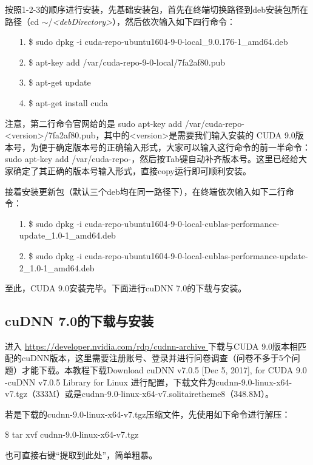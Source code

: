 \documentclass[11pt,a4paper]{ctexart}
\begin{document}
按照1-2-3的顺序进行安装，先基础安装包，首先在终端切换路径到deb安装包所在路径（cd $\sim$/\emph{<debDirectory>}），然后依次输入如下四行命令：
\begin{itemize}
\item[1.] \$ sudo dpkg -i cuda-repo-ubuntu1604-9-0-local\_9.0.176-1\_amd64.deb
\item[2.] \$ apt-key add /var/cuda-repo-{\color{red}9-0-local}/7fa2af80.pub 
\item[3.] \$ apt-get update
\item[4.] \$ apt-get install cuda
\end{itemize}
注意，第二行命令官网给的是 sudo apt-key add /var/cuda-repo-{\color{red}<version>}/7fa2af80.pub，其中的{\color{red}<version>}是需要我们输入安装的 CUDA 9.0版本号，为便于确定版本号的正确输入形式，大家可以输入这行命令的前一半命令：sudo apt-key add /var/cuda-repo-，然后按{\color{red}Tab}键自动补齐版本号。这里已经给大家确定了其正确的版本号输入形式，直接copy运行即可顺利安装。

接着安装更新包（默认三个deb均在同一路径下），在终端依次输入如下二行命令：
\vspace{-0.2cm}
\begin{itemize}
\item[1.] \$ sudo dpkg -i cuda-repo-ubuntu1604-9-0-local-cublas-performance-update\_1.0-1\_amd64.deb 
\item[2.] \$ sudo dpkg -i cuda-repo-ubuntu1604-9-0-local-cublas-performance-update-2\_1.0-1\_amd64.deb 
\end{itemize}

至此，CUDA 9.0安装完毕。下面进行cuDNN 7.0的下载与安装。



\subsection{ cuDNN 7.0的下载与安装}
进入 \url {https://developer.nvidia.com/rdp/cudnn-archive } 下载与CUDA  9.0版本相匹配的cuDNN版本，这里需要注册账号、登录并进行问卷调查（问卷不多于5个问题）才能下载。本教程下载Download cuDNN v7.0.5 [Dec 5, 2017], for CUDA 9.0 -cuDNN v7.0.5 Library for Linux 进行配置，下载文件为cudnn-9.0-linux-x64-v7.tgz（333M）或是cudnn-9.0-linux-x64-v7.solitairetheme8（348.8M）。

若是下载的cudnn-9.0-linux-x64-v7.tgz压缩文件，先使用如下命令进行解压：
\begin{center}
\$ tar xvf cudnn-9.0-linux-x64-v7.tgz
\end{center}
也可直接右键“提取到此处”，简单粗暴。
\end{document}
